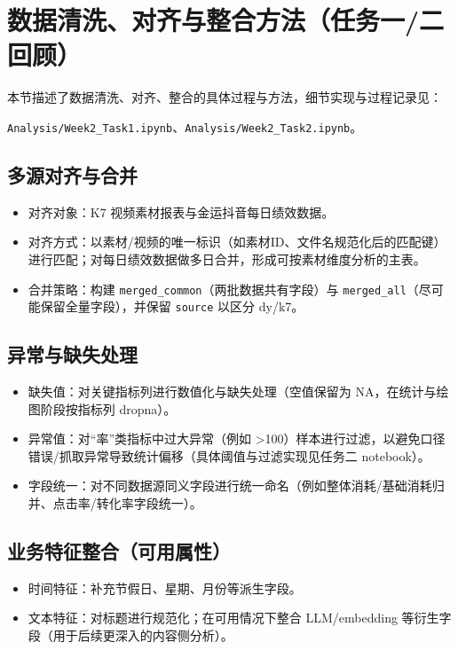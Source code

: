 \documentclass[UTF8,a4paper,11pt]{ctexart}
\begin{document}
\section{数据清洗、对齐与整合方法（任务一/二回顾）}
本节描述了数据清洗、对齐、整合的具体过程与方法，细节实现与过程记录见：


\texttt{Analysis/Week2\_Task1.ipynb}、\texttt{Analysis/Week2\_Task2.ipynb}。

\subsection{多源对齐与合并}
\begin{itemize}
  \item 对齐对象：K7 视频素材报表与金运抖音每日绩效数据。
  \item 对齐方式：以素材/视频的唯一标识（如素材ID、文件名规范化后的匹配键）进行匹配；对每日绩效数据做多日合并，形成可按素材维度分析的主表。
  \item 合并策略：构建 \texttt{merged\_common}（两批数据共有字段）与 \texttt{merged\_all}（尽可能保留全量字段），并保留 \texttt{source} 以区分 dy/k7。
\end{itemize}

\subsection{异常与缺失处理}
\begin{itemize}
  \item 缺失值：对关键指标列进行数值化与缺失处理（空值保留为 NA，在统计与绘图阶段按指标列 dropna）。
  \item 异常值：对``率''类指标中过大异常（例如 >100）样本进行过滤，以避免口径错误/抓取异常导致统计偏移（具体阈值与过滤实现见任务二 notebook）。
  \item 字段统一：对不同数据源同义字段进行统一命名（例如整体消耗/基础消耗归并、点击率/转化率字段统一）。
\end{itemize}

\subsection{业务特征整合（可用属性）}
\begin{itemize}
  \item 时间特征：补充节假日、星期、月份等派生字段。
  \item 文本特征：对标题进行规范化；在可用情况下整合 LLM/embedding 等衍生字段（用于后续更深入的内容侧分析）。
\end{itemize}
\end{document}
